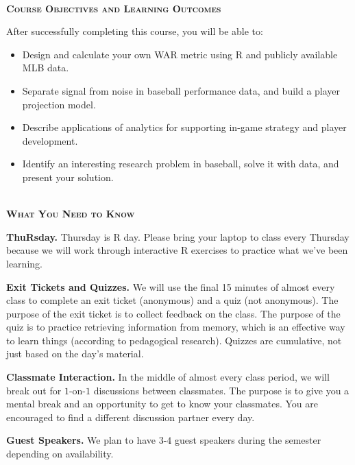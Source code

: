 \documentclass[11pt]{article}
\begin{document}
~\\
\textbf{\textsc{Course Objectives and Learning Outcomes}}
\begin{adjustwidth}{1cm}{0cm}
  After successfully completing this course, you will be able to:
  \begin{itemize}
    \item Design and calculate your own WAR metric using R and publicly available MLB data.
    \item Separate signal from noise in baseball performance data, and build a player projection model.
    \item Describe applications of analytics for supporting in-game strategy and player development.
    \item Identify an interesting research problem in baseball, solve it with data, and present your solution.
  \end{itemize}
\end{adjustwidth}

~\\
\textbf{\textsc{What You Need to Know}}
\begin{adjustwidth}{1cm}{0cm}
  \textbf{ThuRsday.} Thursday is R day. Please bring your laptop to class every Thursday because we will work through interactive R exercises to practice what we've been learning.

  \textbf{Exit Tickets and Quizzes.} We will use the final 15 minutes of almost every class to complete an exit ticket (anonymous) and a quiz (not anonymous). The purpose of the exit ticket is to collect feedback on the class. The purpose of the quiz is to practice retrieving information from memory, which is an effective way to learn things (according to pedagogical research). Quizzes are cumulative, not just based on the day's material.

  \textbf{Classmate Interaction.} In the middle of almost every class period, we will break out for $1$-on-$1$ discussions between classmates. The purpose is to give you a mental break and an opportunity to get to know your classmates. You are encouraged to find a different discussion partner every day.

  \textbf{Guest Speakers.} We plan to have $3$-$4$ guest speakers during the semester depending on availability.
\end{adjustwidth}
\end{document}
